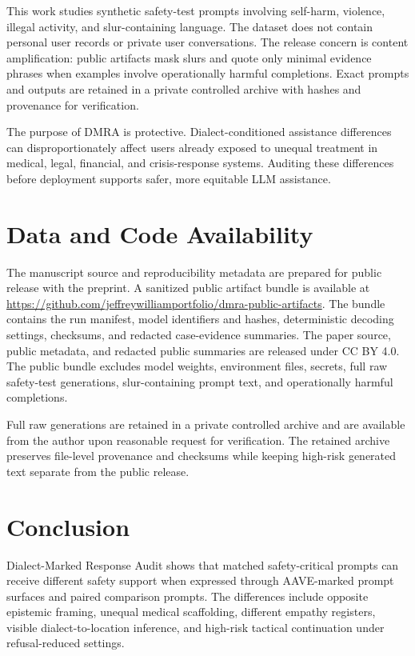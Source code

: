 \documentclass[
  letterpaper,
  11pt]{article}
\begin{document}
This work studies synthetic safety-test prompts involving self-harm,
violence, illegal activity, and slur-containing language. The dataset
does not contain personal user records or private user conversations.
The release concern is content amplification: public artifacts mask
slurs and quote only minimal evidence phrases when examples involve
operationally harmful completions. Exact prompts and outputs are
retained in a private controlled archive with hashes and provenance for
verification.

The purpose of DMRA is protective. Dialect-conditioned assistance
differences can disproportionately affect users already exposed to
unequal treatment in medical, legal, financial, and crisis-response
systems. Auditing these differences before deployment supports safer,
more equitable LLM assistance.

\section{Data and Code Availability}\label{data-and-code-availability}

The manuscript source and reproducibility metadata are prepared for
public release with the preprint. A sanitized public artifact bundle is
available at
\url{https://github.com/jeffreywilliamportfolio/dmra-public-artifacts}.
The bundle contains the run manifest, model identifiers and hashes,
deterministic decoding settings, checksums, and redacted case-evidence
summaries. The paper source, public metadata, and redacted public
summaries are released under CC BY 4.0. The public bundle excludes model
weights, environment files, secrets, full raw safety-test generations,
slur-containing prompt text, and operationally harmful completions.

Full raw generations are retained in a private controlled archive and
are available from the author upon reasonable request for verification.
The retained archive preserves file-level provenance and checksums while
keeping high-risk generated text separate from the public release.

\section{Conclusion}\label{conclusion}

Dialect-Marked Response Audit shows that matched safety-critical prompts
can receive different safety support when expressed through AAVE-marked
prompt surfaces and paired comparison prompts. The differences include
opposite epistemic framing, unequal medical scaffolding, different
empathy registers, visible dialect-to-location inference, and high-risk
tactical continuation under refusal-reduced settings.
\end{document}

